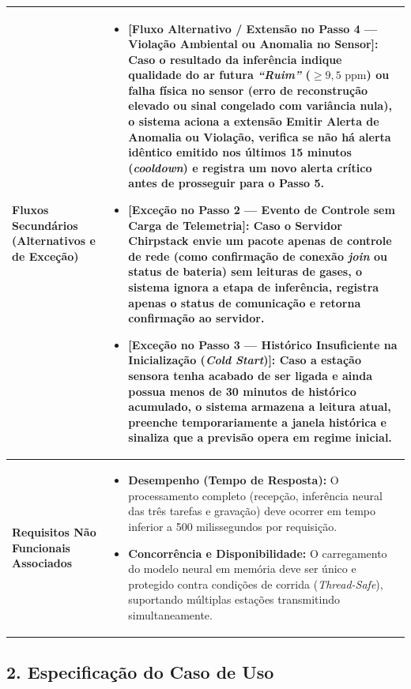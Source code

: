 \documentclass[11pt, a4paper]{article}
\begin{document}
\begin{longtable}{|>{\bfseries}p{3.8cm}|p{12.2cm}|}
Fluxos Secundários (Alternativos e de Exceção) & 
\begin{itemize}[nosep, leftmargin=0.5cm]
    \item \textbf{[Fluxo Alternativo / Extensão no Passo 4 --- Violação Ambiental ou Anomalia no Sensor]:} Caso o resultado da inferência indique qualidade do ar futura \emph{``Ruim''} ($\ge 9{,}5\textrm{ ppm}$) ou falha física no sensor (erro de reconstrução elevado ou sinal congelado com variância nula), o sistema aciona a extensão  Emitir Alerta de Anomalia ou Violação, verifica se não há alerta idêntico emitido nos últimos 15 minutos (\emph{cooldown}) e registra um novo alerta crítico antes de prosseguir para o Passo 5.
    \item \textbf{[Exceção no Passo 2 --- Evento de Controle sem Carga de Telemetria]:} Caso o Servidor Chirpstack envie um pacote apenas de controle de rede (como confirmação de conexão \emph{join} ou status de bateria) sem leituras de gases, o sistema ignora a etapa de inferência, registra apenas o status de comunicação e retorna confirmação ao servidor.
    \item \textbf{[Exceção no Passo 3 --- Histórico Insuficiente na Inicialização (\emph{Cold Start})]:} Caso a estação sensora tenha acabado de ser ligada e ainda possua menos de 30 minutos de histórico acumulado, o sistema armazena a leitura atual, preenche temporariamente a janela histórica e sinaliza que a previsão opera em regime inicial.
\end{itemize} \\ \hline

Requisitos Não Funcionais Associados & 
\begin{itemize}[nosep, leftmargin=0.5cm]
    \item \textbf{Desempenho (Tempo de Resposta):} O processamento completo (recepção, inferência neural das três tarefas e gravação) deve ocorrer em tempo inferior a 500 milissegundos por requisição.
    \item \textbf{Concorrência e Disponibilidade:} O carregamento do modelo neural em memória deve ser único e protegido contra condições de corrida (\emph{Thread-Safe}), suportando múltiplas estações transmitindo simultaneamente.
\end{itemize} \\ \hline
\end{longtable}

\subsection*{2. Especificação do Caso de Uso}
\end{document}
